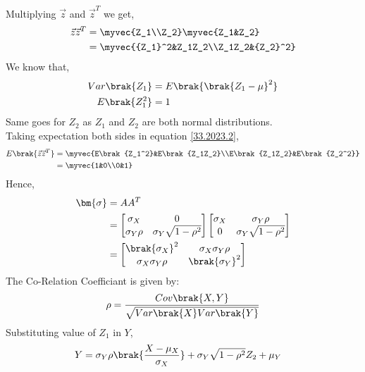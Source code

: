 \documentclass[journal,12pt,twocolumn]{IEEEtran}
\theoremstyle{remark}
\begin{document}
Multiplying $\vec{z}$ and $\vec{z}^T$ we get,
\begin{align}
\vec{z}\vec{z}^T &= \myvec{Z_1\\Z_2}\myvec{Z_1&Z_2}\\
		 &= \myvec{{Z_1}^2&Z_1Z_2\\Z_1Z_2&{Z_2}^2}\label{33.2023.2}
\end{align}
We know that, 
\begin{align}
Var\brak{Z_1} &= E\brak{\brak{Z_1-\mu}^2}\\
E\brak{Z_1^2} &= 1
\end{align}
Same goes for $Z_2$ as $Z_1$ and $Z_2$ are both normal distributions.\\ 
Taking expectation both sides in equation \eqref{33.2023.2},
\begin{align}
E\brak{\vec{z}\vec{z}^T} &= \myvec{E\brak{Z_1^2}&E\brak{Z_1Z_2}\\E\brak{Z_1Z_2}&E\brak{Z_2^2}}\\
			 &= \myvec{1&0\\0&1}
\end{align}
Hence,
\begin{align}
\bm{\sigma} &= AA^T\\
	      &= 
\begin{bmatrix}
    \sigma_X & 0 \\
    \sigma_Y\rho & \sigma_Y\sqrt{1-{\rho}^2} \\
\end{bmatrix}
\begin{bmatrix}
    \sigma_X & \sigma_Y\rho \\
    0 & \sigma_Y\sqrt{1-{\rho}^2} \\
\end{bmatrix}\\
	      &= 
\begin{bmatrix}
\brak{\sigma_X}^2 & \sigma_X\sigma_Y\rho \\
\sigma_X\sigma_Y\rho & \brak{\sigma_Y}^2 \\
\end{bmatrix}
\end{align}
The Co-Relation Coefficiant is given by:
\begin{align}
\rho = \frac{Cov\brak{X,Y}}{\sqrt{Var\brak{X}Var\brak{Y}}}  
\end{align}
Substituting value of $Z_1$ in $Y$,
\begin{align}
Y &= \sigma_Y\rho\brak{\frac{X - \mu_X}{\sigma_X}} + \sigma_Y\sqrt{1 - {\rho}^2}Z_2 + \mu_Y
\end{align}
\end{document}
